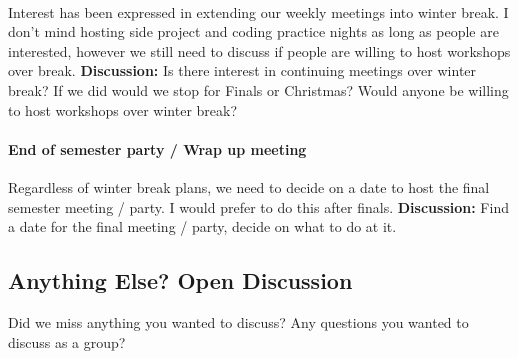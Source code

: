\documentclass{article}
\begin{document}
\paragraph{}
Interest has been expressed in extending our weekly meetings into winter break. I don't mind hosting side project and coding practice nights as long as people are interested, however we still need to discuss if people are willing to host workshops over break.
\newline\newline
\textbf{Discussion:} Is there interest in continuing meetings over winter break? If we did would we stop for Finals or Christmas? Would anyone be willing to host workshops over winter break? 
\paragraph{End of semester party / Wrap up meeting}
Regardless of winter break plans, we need to decide on a date to host the final semester meeting / party. I would prefer to do this after finals. 
\newline\newline
\textbf{Discussion:} Find a date for the final meeting / party, decide on what to do at it.

\subsection{Anything Else? Open Discussion}
Did we miss anything you wanted to discuss? Any questions you wanted to discuss as a group? 
\end{document}

